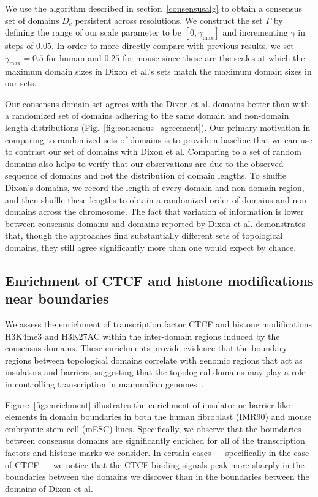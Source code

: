 \documentclass[12pt]{cmuthesis}
\begin{document}
  We use the algorithm described in section~\ref{consensusalg} to obtain a consensus set of domains $D_c$ persistent across resolutions. We construct the set $\Gamma$ by defining the range of our scale parameter to be $[0, \gamma_\textrm{max}]$ and incrementing $\gamma$ in steps of 0.05. In order to more directly compare with previous results, we set $\gamma_{\max}=0.5$ for human and $0.25$ for mouse since these are the scales at which the maximum domain sizes in Dixon et al.'s sets match the maximum domain sizes in our sets.

  Our consensus domain set agrees with the Dixon et al. domains better than with a randomized set of domains adhering to the same domain and non-domain length distributions (Fig.~\ref{fig:consensus_agreement}). Our primary motivation in comparing to randomized sets of domains is to provide a baseline that we can use to contrast our set of domains with Dixon et al. Comparing to a set of random domains also helps to verify that our observations are due to the observed sequence of domains and not the distribution of domain lengths. To shuffle Dixon's domains, we record the length of every domain and non-domain region, and then shuffle these lengths to obtain a randomized order of domains and non-domains across the chromosome.  The fact that variation of information is lower between consensus domains and domains reported by Dixon et al. demonstrates that, though the approaches find substantially different sets of topological domains, they still agree significantly more than one would expect by chance.

  \subsection{Enrichment of CTCF and histone modifications near boundaries}
  \label{sec:Enrichment}

  We assess the enrichment of transcription factor CTCF and histone modifications H3K4me3 and H3K27AC within the inter-domain regions induced by the consensus domains. These enrichments provide evidence that the boundary regions between topological domains correlate with genomic regions that act as insulators and barriers, suggesting that the topological domains may play a role in controlling transcription in mammalian genomes~\cite{Dixon2012}.

  Figure~\ref{fig:enrichment} illustrates the enrichment of insulator or barrier-like elements in domain boundaries in both the human fibroblast (IMR90) and mouse embryonic stem cell (mESC) lines.  Specifically, we observe that
  the boundaries between consensus domains are significantly enriched for all of the transcription factors and histone marks we consider.  In certain cases --- specifically in the case of CTCF --- we notice that the CTCF binding signals peak more sharply in the boundaries between the domains we discover than in the boundaries between the domains of Dixon et al.
\end{document}
